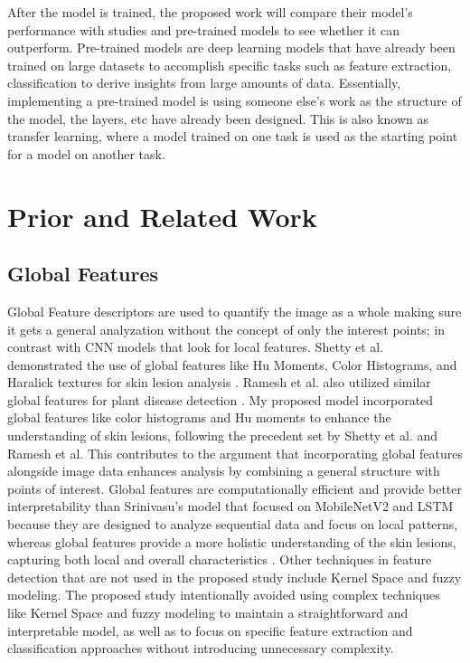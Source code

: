 \documentclass[10pt,twocolumn]{article}
\begin{document}
\newline
\newline
After the model is trained, the proposed work will compare their model’s performance with studies and pre-trained models to see whether it can outperform. Pre-trained models are deep learning models that have already been trained on large datasets to accomplish specific tasks such as feature extraction, classification to derive insights from large amounts of data. Essentially, implementing a pre-trained model is using someone else’s work as the structure of the model, the layers, etc have already been designed. This is also known as transfer learning, where a model trained on one task is used as the starting point for a model on another task. 

\section{Prior and Related Work}

\subsection{Global Features}
Global Feature descriptors are used to quantify the image as a whole making sure it gets a general analyzation without the concept of only the interest points; in contrast with CNN models that look for local features.  
\newline
\newline
Shetty et al. demonstrated the use of global features like Hu Moments, Color Histograms, and Haralick textures for skin lesion analysis \cite{shetty2022skin}. Ramesh et al. also utilized similar global features for plant disease detection \cite{ramesh2018plant}. My proposed model incorporated global features like color histograms and Hu moments to enhance the understanding of skin lesions, following the precedent set by Shetty et al. and Ramesh et al. This contributes to the argument that incorporating global features alongside image data enhances analysis by combining a general structure with points of interest.
\newline
\newline
Global features are computationally efficient and provide better interpretability than Srinivasu’s model that focused on MobileNetV2 and LSTM because they are designed to analyze sequential data and focus on local patterns, whereas global features provide a more holistic understanding of the skin lesions, capturing both local and overall characteristics \cite{srinivasu2021classification}.
\newline\newline
Other techniques in feature detection that are not used in the proposed study include Kernel Space and fuzzy modeling. The proposed study intentionally avoided using complex techniques like Kernel Space and fuzzy modeling to maintain a straightforward and interpretable model, as well as to focus on specific feature extraction and classification approaches without introducing unnecessary complexity.
\end{document}
